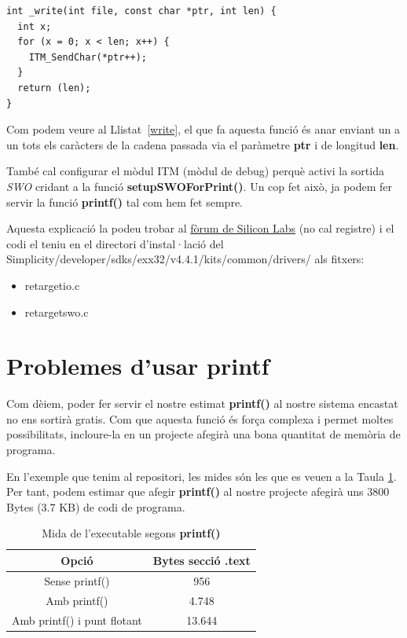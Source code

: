 \begin{lstlisting}[caption={Funció {\bf \_write()}},style=customc,label=write]
int _write(int file, const char *ptr, int len) {
  int x;
  for (x = 0; x < len; x++) {
    ITM_SendChar(*ptr++);
  }
  return (len);
}
\end{lstlisting}

Com podem veure al Llistat~\ref{write}, el que fa aquesta funció és anar enviant un a un tots els caràcters de la cadena passada via el paràmetre {\bf ptr} i de longitud {\bf len}.

També cal configurar el mòdul ITM (mòdul de debug) perquè activi la sortida {\em SWO} cridant a la funció {\bf setupSWOForPrint()}. Un cop fet això, ja podem fer servir la funció {\bf printf()} tal com hem fet sempre.

Aquesta explicació la podeu trobar al \href{http://community.silabs.com/t5/Simplicity-Studio-and-Software/how-to-enable-printf-output/td-p/133981}{fòrum de Silicon Labs} (no cal registre) i el codi el teniu en el directori d'instal·lació del Simplicity/developer/sdks/exx32/v4.4.1/kits/common/drivers/ als fitxers:
\begin{itemize}
 \item retargetio.c
 \item retargetswo.c
\end{itemize}

\section{Problemes d'usar printf}
Com dèiem, poder fer servir el nostre estimat {\bf printf()} al nostre sistema encastat no ens sortirà gratis. Com que aquesta funció és força complexa i permet moltes possibilitats, incloure-la en un projecte afegirà una bona quantitat de memòria de programa.

En l'exemple que tenim al repositori, les mides són les que es veuen a la Taula \ref{tb:printfsize}. Per tant, podem estimar que afegir {\bf printf()} al nostre projecte afegirà uns 3800 Bytes (3.7 KB) de codi de programa.

\begin{table}[htb]
\caption{Mida de l'executable segons {\bf printf()}}
\centering
\begin{tabular}{|c|c|}
\hline
{\bf Opció } & {\bf Bytes secció .text} \\
\hline
Sense printf() & 956\\
\hline
Amb printf() & 4.748\\
\hline
Amb printf() i punt flotant &13.644\\
\hline
\end{tabular}
\label{tb:printfsize}
\end{table}

